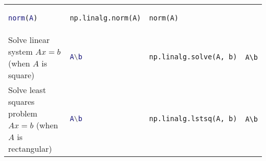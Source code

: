 \documentclass[10pt, landscape]{article}
\begin{document}
\begin{multicols}{2}
\begin{tabular}[]{@{}llll@{}}
\begin{minipage}[t]{0.22\columnwidth}
\begin{lstlisting}[language=Matlab]
norm(A)
\end{lstlisting}
\strut
\end{minipage} & \begin{minipage}[t]{0.23\columnwidth}\raggedright\strut
\begin{lstlisting}[language=Python]
np.linalg.norm(A)
\end{lstlisting}
\strut
\end{minipage} & \begin{minipage}[t]{0.20\columnwidth}\raggedright\strut
\begin{lstlisting}
norm(A)
\end{lstlisting}
\strut
\end{minipage}\tabularnewline
\begin{minipage}[t]{0.23\columnwidth}\raggedright\strut
Solve linear system \(Ax=b\) (when \(A\) is square)\strut
\end{minipage} & \begin{minipage}[t]{0.22\columnwidth}\raggedright\strut
\begin{lstlisting}[language=Matlab]
A\b
\end{lstlisting}
\strut
\end{minipage} & \begin{minipage}[t]{0.23\columnwidth}\raggedright\strut
\begin{lstlisting}[language=Python]
np.linalg.solve(A, b)
\end{lstlisting}
\strut
\end{minipage} & \begin{minipage}[t]{0.20\columnwidth}\raggedright\strut
\begin{lstlisting}
A\b
\end{lstlisting}
\strut
\end{minipage}\tabularnewline
\begin{minipage}[t]{0.23\columnwidth}\raggedright\strut
Solve least squares problem \(Ax=b\) (when \(A\) is rectangular)\strut
\end{minipage} & \begin{minipage}[t]{0.22\columnwidth}\raggedright\strut
\begin{lstlisting}[language=Matlab]
A\b
\end{lstlisting}
\strut
\end{minipage} & \begin{minipage}[t]{0.23\columnwidth}\raggedright\strut
\begin{lstlisting}[language=Python]
np.linalg.lstsq(A, b)
\end{lstlisting}
\strut
\end{minipage} & \begin{minipage}[t]{0.20\columnwidth}\raggedright\strut
\begin{lstlisting}
A\b
\end{lstlisting}
\strut
\end{minipage}\tabularnewline
\bottomrule
\end{tabular}


\end{multicols}
\end{document}
